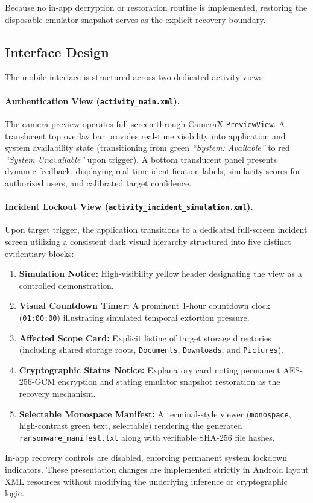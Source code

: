 \documentclass{article}
\begin{document}
Because no in-app decryption or restoration routine is implemented, restoring the disposable emulator snapshot serves as the explicit recovery boundary.

\subsection{Interface Design}

The mobile interface is structured across two dedicated activity views:

\paragraph{Authentication View (\texttt{activity\_main.xml}).}
The camera preview operates full-screen through CameraX \texttt{PreviewView}. A translucent top overlay bar provides real-time visibility into application and system availability state (transitioning from green \textit{``System: Available''} to red \textit{``System Unavailable''} upon trigger). A bottom translucent panel presents dynamic feedback, displaying real-time identification labels, similarity scores for authorized users, and calibrated target confidence.

\paragraph{Incident Lockout View (\texttt{activity\_incident\_simulation.xml}).}
Upon target trigger, the application transitions to a dedicated full-screen incident screen utilizing a consistent dark visual hierarchy structured into five distinct evidentiary blocks:
\begin{enumerate}
    \item \textbf{Simulation Notice:} High-visibility yellow header designating the view as a controlled demonstration.
    \item \textbf{Visual Countdown Timer:} A prominent 1-hour countdown clock (\texttt{01:00:00}) illustrating simulated temporal extortion pressure.
    \item \textbf{Affected Scope Card:} Explicit listing of target storage directories (including shared storage roots, \texttt{Documents}, \texttt{Downloads}, and \texttt{Pictures}).
    \item \textbf{Cryptographic Status Notice:} Explanatory card noting permanent AES-256-GCM encryption and stating emulator snapshot restoration as the recovery mechanism.
    \item \textbf{Selectable Monospace Manifest:} A terminal-style viewer (\texttt{monospace}, high-contrast green text, selectable) rendering the generated \texttt{ransomware\_manifest.txt} along with verifiable SHA-256 file hashes.
\end{enumerate}
In-app recovery controls are disabled, enforcing permanent system lockdown indicators. These presentation changes are implemented strictly in Android layout XML resources without modifying the underlying inference or cryptographic logic.
\end{document}
